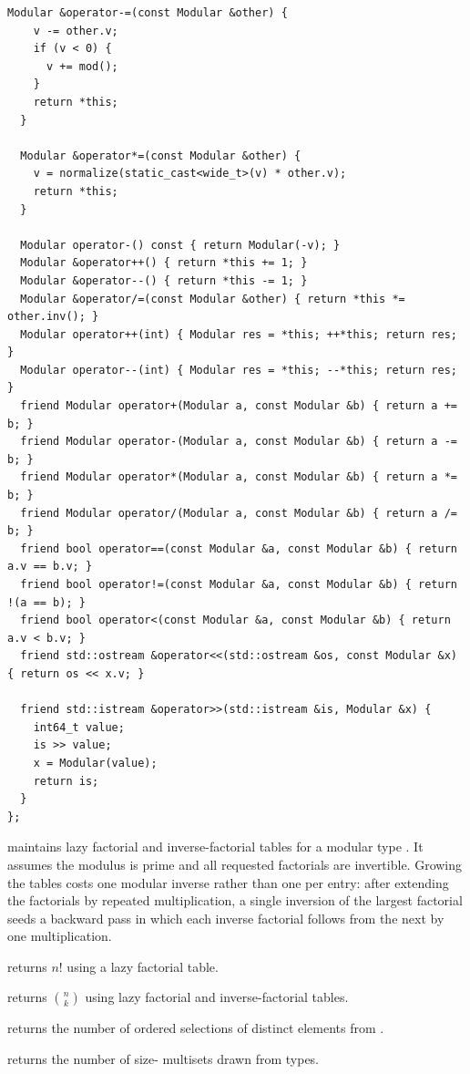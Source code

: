 \begin{lstlisting}[style=cpp]
  Modular &operator-=(const Modular &other) {
    v -= other.v;
    if (v < 0) {
      v += mod();
    }
    return *this;
  }

  Modular &operator*=(const Modular &other) {
    v = normalize(static_cast<wide_t>(v) * other.v);
    return *this;
  }

  Modular operator-() const { return Modular(-v); }
  Modular &operator++() { return *this += 1; }
  Modular &operator--() { return *this -= 1; }
  Modular &operator/=(const Modular &other) { return *this *= other.inv(); }
  Modular operator++(int) { Modular res = *this; ++*this; return res; }
  Modular operator--(int) { Modular res = *this; --*this; return res; }
  friend Modular operator+(Modular a, const Modular &b) { return a += b; }
  friend Modular operator-(Modular a, const Modular &b) { return a -= b; }
  friend Modular operator*(Modular a, const Modular &b) { return a *= b; }
  friend Modular operator/(Modular a, const Modular &b) { return a /= b; }
  friend bool operator==(const Modular &a, const Modular &b) { return a.v == b.v; }
  friend bool operator!=(const Modular &a, const Modular &b) { return !(a == b); }
  friend bool operator<(const Modular &a, const Modular &b) { return a.v < b.v; }
  friend std::ostream &operator<<(std::ostream &os, const Modular &x) { return os << x.v; }

  friend std::istream &operator>>(std::istream &is, Modular &x) {
    int64_t value;
    is >> value;
    x = Modular(value);
    return is;
  }
};
\end{lstlisting}
 maintains lazy factorial and inverse-factorial tables for a modular type . It assumes the modulus is prime and all requested factorials are invertible. Growing the tables costs one modular inverse rather than one per entry: after extending the factorials by repeated multiplication, a single inversion of the largest factorial seeds a backward pass in which each inverse factorial follows from the next by one multiplication.

\begin{compactitem}
  \item {} returns $n!$ using a lazy factorial table.
  \item {} returns $\binom n k$ using lazy factorial and inverse-factorial tables.
  \item {} returns the number of ordered selections of  distinct elements from .
  \item {} returns the number of size- multisets drawn from  types.
\end{compactitem}

